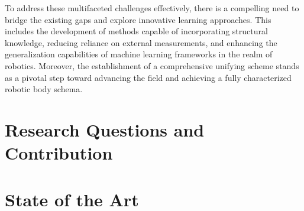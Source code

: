 To address these multifaceted challenges effectively, there is a compelling need to bridge the existing gaps and explore innovative learning approaches. This includes the development of methods capable of incorporating structural knowledge, reducing reliance on external measurements, and enhancing the generalization capabilities of machine learning frameworks in the realm of robotics. Moreover, the establishment of a comprehensive unifying scheme stands as a pivotal step toward advancing the field and achieving a fully characterized robotic body schema.

\section{Research Questions and Contribution}
%


\section{State of the Art}
%


